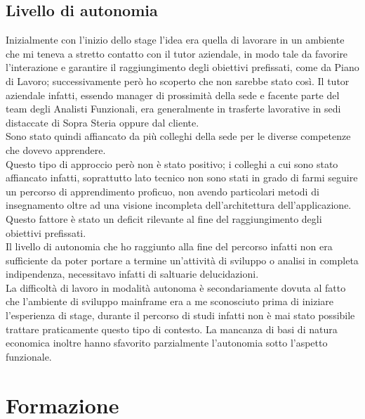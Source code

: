 \subsection{Livello di autonomia}

	Inizialmente con l'inizio dello stage l'idea era quella di lavorare in un ambiente che mi teneva a stretto contatto con il tutor aziendale, in modo tale da favorire l'interazione e garantire il raggiungimento degli obiettivi prefissati, come da Piano di Lavoro; successivamente però ho scoperto che non sarebbe stato così. Il tutor aziendale infatti, essendo manager di prossimità della sede e facente parte del team degli Analisti Funzionali, era generalmente in trasferte lavorative in sedi distaccate di Sopra Steria oppure dal cliente.\\
	
	Sono stato quindi affiancato da più colleghi della sede per le diverse competenze che dovevo apprendere.\\
	
	Questo tipo di approccio però non è stato positivo; i colleghi a cui sono stato affiancato infatti, soprattutto lato tecnico non sono stati in grado di farmi seguire un percorso di apprendimento proficuo, non avendo particolari metodi di insegnamento oltre ad una visione incompleta dell'architettura dell'applicazione.\\
	
	Questo fattore è stato un deficit rilevante al fine del raggiungimento degli obiettivi prefissati.\\

	Il livello di autonomia che ho raggiunto alla fine del percorso infatti non era sufficiente da poter portare a termine un'attività di sviluppo o analisi in completa indipendenza, necessitavo infatti di saltuarie delucidazioni.\\
	
	La difficoltà di lavoro in modalità autonoma è secondariamente dovuta al fatto che l'ambiente di sviluppo mainframe era a me sconosciuto prima di iniziare l'esperienza di stage, durante il percorso di studi infatti non è mai stato possibile trattare praticamente questo tipo di contesto. La mancanza di basi di natura economica inoltre hanno sfavorito parzialmente l'autonomia sotto l'aspetto funzionale.

\section{Formazione}

